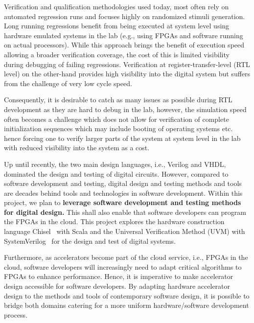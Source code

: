 \documentclass[fleqn,12pt]{article}
\newcommand{\note}[1]{{\it Note: #1}}
\begin{document}
Verification and qualification methodologies used today, most often rely on automated regression runs and focuses highly on randomized stimuli generation. Long running regressions benefit from being executed at system level using hardware emulated systems in the lab (e.g., using FPGAs and software running on actual processors). While this approach brings the benefit of execution speed allowing a broader verification coverage, the cost of this is limited visibility during debugging of failing regressions. Verification at register-transfer-level (RTL level) on the other-hand provides high visibility into the digital system but suffers from the challenge of very low cycle speed.

Consequently, it is desirable to catch as many issues as possible during RTL development as they are hard to debug in the lab, however, the simulation speed often becomes a challenge which does not allow for verification of complete initialization sequences which may include booting of operating systems etc. hence forcing one to verify larger parts of the system at system level in the lab with reduced visibility into the system as a cost.

Up until recently, the two main design languages, i.e., Verilog and VHDL, dominated the
design and testing of digital circuits.
However, compared to software development and testing, digital design and testing methods
and tools are decades behind tools and technologies in software development.
Within this project, we plan to
{\bf leverage software development and testing methods for digital design.}
This shall also enable that software developers can program the FPGAs in the cloud.
This project explores the hardware construction language Chisel~\cite{chisel:dac2012} with Scala
and the Universal Verification Method (UVM) with SystemVerilog~\cite{SystemVerilog} for
the design and test of digital systems.

Furthermore, as accelerators become part of the cloud service, i.e., FPGAs in the cloud,
software developers will increasingly need to adapt critical algorithms to FPGAs to enhance performance.
Hence, it is imperative to make accelerator design accessible for software developers.
By adapting hardware accelerator design to the methods and tools of contemporary software design,
it is possible to bridge both domains catering for a more uniform hardware/software development process.
\end{document}
